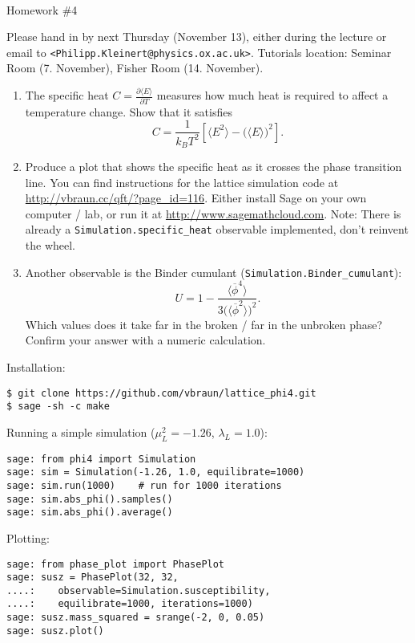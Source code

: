 \documentclass[12pt]{article}
\begin{document}
~
\vspace{-2cm}
\begin{center}
  {\Huge Homework \#4}
\end{center}
\vspace{1cm}

\noindent Please hand in by next Thursday (November 13), either during
the lecture or email to \texttt{<Philipp.Kleinert@physics.ox.ac.uk>}.
Tutorials location: Seminar Room (7. November), Fisher Room
(14. November).



\begin{enumerate}
\item The specific heat $C=\tfrac{\partial\langle E\rangle}{\partial
    T}$ measures how much heat is required to affect a temperature
  change. Show that it satisfies 
  \begin{equation}
    C = \frac{1}{k_B T^2} \left[
      \langle E^2 \rangle - 
      \big( \langle E \rangle \big)^2
    \right].
  \end{equation}
\item Produce a plot that shows the specific heat as it crosses the
  phase transition line. You can find instructions for the lattice
  simulation code at \url{http://vbraun.cc/qft/?page_id=116}. Either
  install Sage on your own computer / lab, or run it at
  \url{http://www.sagemathcloud.com}. Note: There is already a
  \texttt{Simulation.specific\_heat} observable implemented, don't
  reinvent the wheel.

\item Another observable is the Binder cumulant
  (\texttt{Simulation.Binder\_cumulant}):
  \begin{equation}
    U = 1 - \frac{\langle \overline\phi^4 \rangle}
    {3 \big(\langle\overline\phi^2\rangle\big)^2}.
  \end{equation}
  Which values does it take far in the broken / far in the unbroken
  phase? Confirm your answer with a numeric calculation.
\end{enumerate}
Installation:
\begin{verbatim}
$ git clone https://github.com/vbraun/lattice_phi4.git
$ sage -sh -c make
\end{verbatim}
Running a simple simulation ($\mu_L^2=-1.26$, $\lambda_L=1.0$):
\begin{verbatim}
sage: from phi4 import Simulation
sage: sim = Simulation(-1.26, 1.0, equilibrate=1000)
sage: sim.run(1000)    # run for 1000 iterations
sage: sim.abs_phi().samples()
sage: sim.abs_phi().average()
\end{verbatim}
Plotting:
\begin{verbatim}
sage: from phase_plot import PhasePlot
sage: susz = PhasePlot(32, 32, 
....:    observable=Simulation.susceptibility, 
....:    equilibrate=1000, iterations=1000)
sage: susz.mass_squared = srange(-2, 0, 0.05)
sage: susz.plot()
\end{verbatim}
\end{document}
